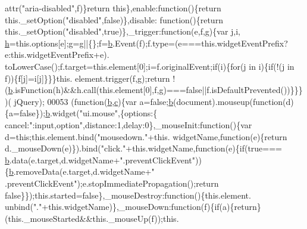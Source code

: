 \begin{DoxyCode}
      attr(\textcolor{stringliteral}{"aria-disabled"},f)\}\textcolor{keywordflow}{return} \textcolor{keyword}{this}\},enable:\textcolor{keyword}{function}()\{\textcolor{keywordflow}{return} this.\_setOption(\textcolor{stringliteral}{"disabled"},\textcolor{keyword}{false})\},disable:\textcolor{keyword}{
      function}()\{\textcolor{keywordflow}{return} this.\_setOption(\textcolor{stringliteral}{"disabled"},\textcolor{keyword}{true})\},\_trigger:\textcolor{keyword}{function}(e,f,g)\{var j,i,
      \hyperlink{all__1a_8js_aebecdaf2444e2be39f4804412d6a3bf8}{h}=this.options[e];g=g||\{\};f=\hyperlink{jquery_8js_aa4026ad5544b958e54ce5e106fa1c805}{b}.Event(f);f.type=(e===this.widgetEventPrefix?e:this.widgetEventPrefix+e).
      toLowerCase();f.target=this.element[0];i=f.originalEvent;\textcolor{keywordflow}{if}(i)\{\textcolor{keywordflow}{for}(j in i)\{\textcolor{keywordflow}{if}(!(j in f))\{f[j]=i[j]\}\}\}this.
      element.trigger(f,g);\textcolor{keywordflow}{return} !(\hyperlink{jquery_8js_aa4026ad5544b958e54ce5e106fa1c805}{b}.isFunction(h)&&h.call(this.element[0],f,g)===\textcolor{keyword}{false}||f.isDefaultPrevented())\}\}\})(
      jQuery);
00053 (\textcolor{keyword}{function}(\hyperlink{jquery_8js_aa4026ad5544b958e54ce5e106fa1c805}{b},\hyperlink{jquery_8js_ad171626e81625b5e9f5cb177a3a8fb1c}{c})\{var a=\textcolor{keyword}{false};\hyperlink{jquery_8js_aa4026ad5544b958e54ce5e106fa1c805}{b}(document).mouseup(\textcolor{keyword}{function}(d)\{a=\textcolor{keyword}{false}\});\hyperlink{jquery_8js_aa4026ad5544b958e54ce5e106fa1c805}{b}.widget(\textcolor{stringliteral}{"ui.mouse"},\{options:\{
      cancel:\textcolor{stringliteral}{":input,option"},distance:1,delay:0\},\_mouseInit:\textcolor{keyword}{function}()\{var d=\textcolor{keyword}{this};this.element.bind(\textcolor{stringliteral}{"mousedown."}+this.
      widgetName,\textcolor{keyword}{function}(e)\{\textcolor{keywordflow}{return} d.\_mouseDown(e)\}).bind(\textcolor{stringliteral}{"click."}+this.widgetName,\textcolor{keyword}{function}(e)\{\textcolor{keywordflow}{if}(\textcolor{keyword}{true}===
      \hyperlink{jquery_8js_aa4026ad5544b958e54ce5e106fa1c805}{b}.data(e.target,d.widgetName+\textcolor{stringliteral}{".preventClickEvent"}))\{\hyperlink{jquery_8js_aa4026ad5544b958e54ce5e106fa1c805}{b}.removeData(e.target,d.widgetName+\textcolor{stringliteral}{"
      .preventClickEvent"});e.stopImmediatePropagation();\textcolor{keywordflow}{return} \textcolor{keyword}{false}\}\});this.started=\textcolor{keyword}{false}\},\_mouseDestroy:\textcolor{keyword}{function}()\{this.element.
      unbind(\textcolor{stringliteral}{"."}+this.widgetName)\},\_mouseDown:\textcolor{keyword}{function}(f)\{\textcolor{keywordflow}{if}(a)\{\textcolor{keywordflow}{return}\}(this.\_mouseStarted&&this.\_mouseUp(f));this.

\end{DoxyCode}

